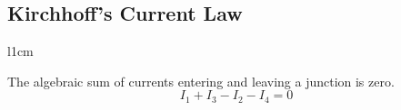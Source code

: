 
\subsection{Kirchhoff's Current Law} %
	\label{subsec:kcl}
	\begin{wrapfigure}[4]{l}{1cm}
		\vspace{-5mm}
	\end{wrapfigure}
	
	The algebraic sum of currents entering and leaving a junction is zero.
	\[
		I_1 + I_3 - I_2 - I_4 = 0
	\]

